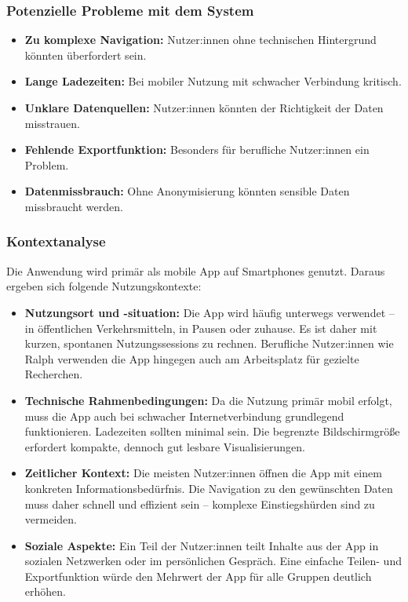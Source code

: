 \subsubsection{Potenzielle Probleme mit dem System}

\begin{itemize}
    \item \textbf{Zu komplexe Navigation:} Nutzer:innen ohne technischen Hintergrund könnten überfordert sein.
    \item \textbf{Lange Ladezeiten:} Bei mobiler Nutzung mit schwacher Verbindung kritisch.
    \item \textbf{Unklare Datenquellen:} Nutzer:innen könnten der Richtigkeit der Daten misstrauen.
    \item \textbf{Fehlende Exportfunktion:} Besonders für berufliche Nutzer:innen ein Problem.
    \item \textbf{Datenmissbrauch:} Ohne Anonymisierung könnten sensible Daten missbraucht werden.
\end{itemize}

\subsubsection{Kontextanalyse}

\smallskip
\noindent
Die Anwendung wird primär als mobile App auf Smartphones genutzt. Daraus ergeben sich folgende Nutzungskontexte:

\begin{itemize}
    \item \textbf{Nutzungsort und -situation:} Die App wird häufig unterwegs verwendet -- in öffentlichen Verkehrsmitteln, in Pausen oder zuhause. Es ist daher mit kurzen, spontanen Nutzungssessions zu rechnen. Berufliche Nutzer:innen wie Ralph verwenden die App hingegen auch am Arbeitsplatz für gezielte Recherchen.
    \item \textbf{Technische Rahmenbedingungen:} Da die Nutzung primär mobil erfolgt, muss die App auch bei schwacher Internetverbindung grundlegend funktionieren. Ladezeiten sollten minimal sein. Die begrenzte Bildschirmgröße erfordert kompakte, dennoch gut lesbare Visualisierungen.
    \item \textbf{Zeitlicher Kontext:} Die meisten Nutzer:innen öffnen die App mit einem konkreten Informationsbedürfnis. Die Navigation zu den gewünschten Daten muss daher schnell und effizient sein -- komplexe Einstiegshürden sind zu vermeiden.
    \item \textbf{Soziale Aspekte:} Ein Teil der Nutzer:innen teilt Inhalte aus der App in sozialen Netzwerken oder im persönlichen Gespräch. Eine einfache Teilen- und Exportfunktion würde den Mehrwert der App für alle Gruppen deutlich erhöhen.
\end{itemize}
